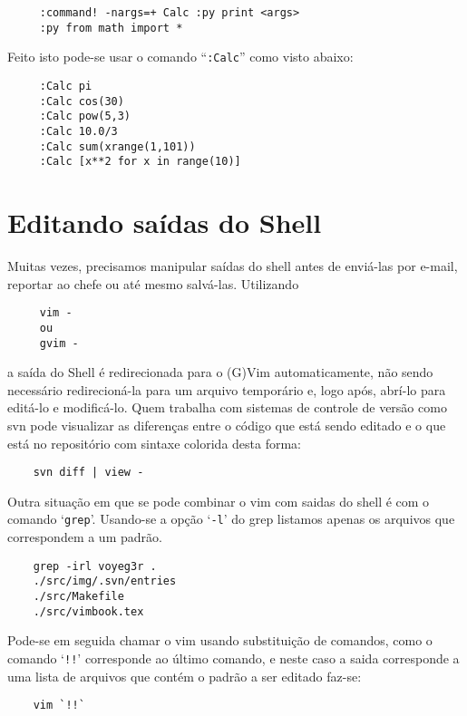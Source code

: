 \begin{verbatim}
     :command! -nargs=+ Calc :py print <args>
     :py from math import *
\end{verbatim}

Feito isto pode-se usar o comando ``{\tt :Calc}'' como visto abaixo:

\begin{verbatim}
     :Calc pi
     :Calc cos(30)
     :Calc pow(5,3)
     :Calc 10.0/3
     :Calc sum(xrange(1,101))
     :Calc [x**2 for x in range(10)] 
\end{verbatim}

\section{Editando saídas do Shell}
\label{sec:Editando saídas do Shell}

Muitas vezes, precisamos manipular saídas do shell antes de enviá-las por e-mail, reportar ao chefe ou até mesmo 
salvá-las. Utilizando

\begin{verbatim}
     vim -
     ou
     gvim -
\end{verbatim}

a saída do Shell é redirecionada para o (G)Vim automaticamente, não sendo
necessário redirecioná-la para um arquivo temporário e, logo após, abrí-lo para
editá-lo e modificá-lo. Quem trabalha com sistemas de controle de versão como svn 
pode visualizar as diferenças entre o código que está sendo editado e o que 
está no repositório com sintaxe colorida desta forma:

\begin{verbatim}
    svn diff | view -
\end{verbatim}

Outra situação em que se pode combinar o vim com saidas do shell é com o
comando `\verb|grep|'. Usando-se a opção `\verb|-l|' do grep listamos apenas os
arquivos que correspondem a um padrão.

\begin{verbatim}
    grep -irl voyeg3r .
    ./src/img/.svn/entries
    ./src/Makefile
    ./src/vimbook.tex
\end{verbatim}

Pode-se em seguida chamar o vim usando substituição de comandos, como o comando
`\verb|!!|' corresponde ao último comando, e neste caso a saida corresponde a
uma lista de arquivos que contém o padrão a ser editado faz-se:

\begin{verbatim}
    vim `!!`
\end{verbatim}

